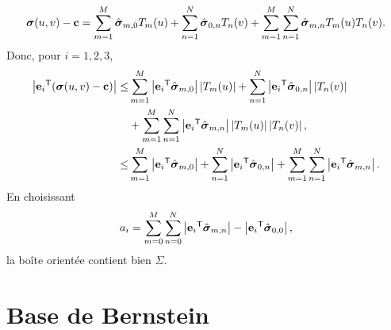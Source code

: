 \begin{equation}
	\boldsymbol{\sigma}(u,v) - \mathbf{c} =
	\sum_{m=1}^{M} \hat{\boldsymbol{\sigma}}_{m,0} T_m(u) +
	\sum_{n=1}^{N} \hat{\boldsymbol{\sigma}}_{0,n} T_n(v) + 
	\sum_{m=1}^{M} \sum_{n=1}^{N} \hat{\boldsymbol{\sigma}}_{m,n} T_m(u) T_n(v).
\end{equation}
Donc, pour $i = 1,2,3$,
\begin{align}
	\left| {\mathbf{e}_i} ^\mathsf{T} {\left( \boldsymbol{\sigma}(u,v) - \mathbf{c} \right)} \right| \leq &
	\sum_{m=1}^{M} \left| {\mathbf{e}_i} ^\mathsf{T} {\hat{\boldsymbol{\sigma}}_{m,0}} \right| \left| T_m(u) \right| + 
	\sum_{n=1}^{N} \left| {\mathbf{e}_i} ^\mathsf{T} {\hat{\boldsymbol{\sigma}}_{0,n}} \right| \left| T_n(v) \right| \nonumber \\
	&+ \sum_{m=1}^{M} \sum_{n=1}^{N} \left| {\mathbf{e}_i} ^\mathsf{T} {\hat{\boldsymbol{\sigma}}_{m,n}} \right| \left| T_m(u) \right| \left| T_n(v) \right| ,\nonumber \\
	\leq &
	\sum_{m=1}^{M} \left| {\mathbf{e}_i} ^\mathsf{T} {\hat{\boldsymbol{\sigma}}_{m,0}} \right| + 
	\sum_{n=1}^{N} \left| {\mathbf{e}_i} ^\mathsf{T} {\hat{\boldsymbol{\sigma}}_{0,n}} \right| + 
	\sum_{m=1}^{M} \sum_{n=1}^{N} \left| {\mathbf{e}_i} ^\mathsf{T} {\hat{\boldsymbol{\sigma}}_{m,n}} \right|.
\end{align}
En choisissant
\begin{equation}
	a_i = 
	\sum_{m=0}^{M} \sum_{n=0}^{N} \left| {\mathbf{e}_i} ^\mathsf{T} {\hat{\boldsymbol{\sigma}}_{m,n}} \right|
	- \left| {\mathbf{e}_i} ^\mathsf{T} {\hat{\boldsymbol{\sigma}}_{0,0}} \right|, 
\end{equation}
la boîte orientée contient bien $\Sigma$.
%
%
%
\section{Base de Bernstein}

